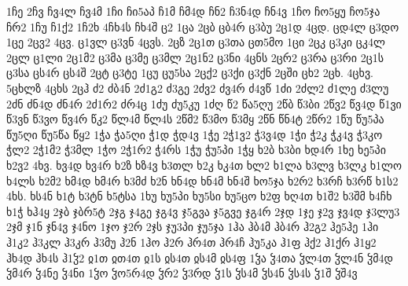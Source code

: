 {1ჩე
2ჩვ
ჩვ4ლ
ჩვ4მ
1ჩი
ჩი5აპ
ჩ1მ
ჩმ4დ
ჩნ2
ჩ3ნ4დ
ჩნ4ვ
1ჩო
ჩო5ყუ
ჩო5ჯა
ჩრ2
1ჩუ
ჩ1ქ2
1ჩ2ხ
4ჩხ4ს
ჩხ4შ
ც2
1ცა
2ცბ
ცბ4რ
ც3ბუ
2ც1დ
4ცდ.
ცდ4ლ
ც3დო
1ცე
2ცვ2
4ცვ.
ც1ვლ
ც3ვნ
4ცვს.
2ცზ
2ც1თ
ც3თა
ცთ5მო
1ცი
2ცკ
ც3კი
ცკ4ლ
2ცლ
ც1ლი
2ც1მ2
ც3მა
ც3მე
ც3მლ
2ც1ნ2
ც3ნი
4ცნს
2ცრ2
ც3რა
ც3რი
2ც1ს
ც3სა
ცს4რ
ცს4შ
2ცტ
ც3ტე
1ცუ
ცუ5სა
2ცქ2
ც3ქი
ც3ქნ
2ცში
ცხ2
2ცხ.
4ცხვ.
5ცხლზ
4ცხს
2ცჰ
ძ2
ძბ4ნ
2ძ1გ2
ძ3გე
2ძვ2
ძვ4რ
ძ4ვწ
1ძი
2ძლ2
ძ1ლე
ძ3ლუ
2ძნ
ძნ4დ
ძნ4რ
2ძ1რ2
ძრ4ც
1ძუ
ძუ5კუ
1ძღ
წ2
წა5ღუ
2წბ
წ3ბი
2წვ2
წვ4დ
წ1ვი
წ3ვნ
წ3ვო
წვ4რ
წკ2
წლ4მ
წლ4ს
2წმ2
წ3მო
წ3მყ
2წნ
წნ4ტ
2წრ2
1წუ
წუ5პა
წუ5ღი
წუ5წა
წყ2
1ჭა
ჭა5ღი
ჭ1დ
ჭდ4ვ
1ჭე
2ჭ1ვ2
ჭ3ვ4დ
1ჭი
ჭ2კ
ჭკ4ვ
ჭ3კო
ჭლ2
2ჭ1მ2
ჭ3მლ
1ჭო
2ჭ1რ2
ჭ4რს
1ჭუ
ჭუ5პი
1ჭყ
ხ2ბ
ხ3ბი
ხდ4რ
1ხე
ხე5პი
ხ2ვ2
4ხვ.
ხვ4დ
ხვ4რ
ხ2ზ
ხზ4ვ
ხ3თლ
ხ2კ
ხკ4თ
ხლ2
ხ1ლა
ხ3ლვ
ხ3ლკ
ხ1ლო
ხ4ლს
ხ2მ2
ხმ4დ
ხმ4რ
ხ3მძ
ხ2ნ
ხნ4დ
ხნ4მ
ხნ4შ
ხო5ჯა
ხ2რ2
ხ3რჩ
ხ3რწ
ხ1ს2
4ხს.
ხს4ნ
ხ1ტ
ხ3ტნ
ხ5ტსა
1ხუ
ხუ5პი
ხუ5სი
ხუ5ცო
ხ2ფ
ხღ4თ
ხ1შ2
ხ3შმ
ხ4ჩხ
ხ1ჭ
ხჰ4ყ
2ჯბ
ჯბრ5ტ
2ჯგ
ჯ4გე
ჯგ4ვ
ჯ5გვა
ჯ5გვე
ჯგ4რ
2ჯდ
1ჯე
ჯ2ვ
ჯვ4დ
ჯ3ლუ3
2ჯმ
ჯ1ნ
ჯნ4ვ
ჯ4ნო
1ჯო
ჯ2რ
2ჯს
ჯუ3პი
ჯუ5ჯა
1ჰა
ჰბ4მ
ჰბ4რ
ჰ2გ2
ჰე5ჰე
1ჰი
ჰ1კ2
ჰ3კლ
ჰ3კრ
ჰ3მუ
ჰ2ნ
1ჰო
ჰ2რ
ჰრ4თ
ჰრ4ჩ
ჰუ5კა
ჰ1ფ
ჰქ2
ჰ1ქრ
ჰ1ყ2
ჰხ4დ
ჰხ4ს
ჰ1ჴ2
ჲ1თ
ჲთ4თ
ჲ1ს
ჲს4თ
ჲს4მ
ჲს4ფ
1ჴა
ჴ4თა
ჴლ4თ
ჴლ4ნ
ჴმ4დ
ჴმ4რ
ჴ4ნე
ჴ4ნი
1ჴო
ჴო5რ4დ
ჴრ2
ჴ3რდ
ჴ1ს
ჴს4მ
ჴს4ნ
ჴს4ს
ჴ1შ
ჴშ4ვ
}

